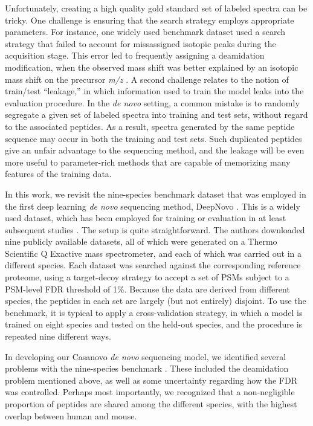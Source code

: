 \documentclass{article}
\newcommand{\fixme}[1]{{\color{red}{\bf #1}\color{black}}}
\begin{document}
Unfortunately, creating a high quality gold standard set of labeled spectra can be tricky.
One challenge is ensuring that the search strategy employs appropriate parameters.
For instance, one widely used benchmark dataset \cite{tran2017denovo} used a search strategy that failed to account for missassigned isotopic peaks during the acquisition stage.
This error led to frequently assigning a deamidation modification, when the observed mass shift was better explained by an isotopic mass shift on the precursor \textit{m/z} \cite{bittremieux2024deep}.
A second challenge relates to the notion of train/test ``leakage,'' in which information used to train the model leaks into the evaluation procedure.
In the \textit{de novo} setting, a common mistake is to randomly segregate a given set of labeled spectra into training and test sets, without regard to the associated peptides.
As a result, spectra generated by the same peptide sequence may occur in both the training and test sets.
Such duplicated peptides give an unfair advantage to the sequencing method, and the leakage will be even more useful to parameter-rich methods that are capable of memorizing many features of the training data.

In this work, we revisit the nine-species benchmark dataset that was employed in the first deep learning \textit{de novo} sequencing method, DeepNovo \cite{tran2017denovo}.
This is a widely used dataset, which has been employed for training or evaluation in at least \fixme{XXX} subsequent studies \cite{XXX}.
The setup is quite straightforward.
The authors downloaded nine publicly available datasets, all of which were generated on a Thermo Scientific Q Exactive mass spectrometer, and each of which was carried out in a different species.
Each dataset was searched against the corresponding reference proteome, using a target-decoy strategy to accept a set of PSMs subject to a PSM-level FDR threshold of 1\%.
Because the data are derived from different species, the peptides in each set are largely (but not entirely) disjoint.
To use the benchmark, it is typical to apply a cross-validation strategy, in which a model is trained on eight species and tested on the held-out species, and the procedure is repeated nine different ways.

In developing our Casanovo \textit{de novo} sequencing model, we identified several problems with the nine-species benchmark \cite{yilmaz2024sequence}.
These included the deamidation problem mentioned above, as well as some uncertainty regarding how the FDR was controlled.
Perhaps most importantly, we recognized that a non-negligible proportion of peptides are shared among the different species, with the highest overlap between human and mouse.
\end{document}

